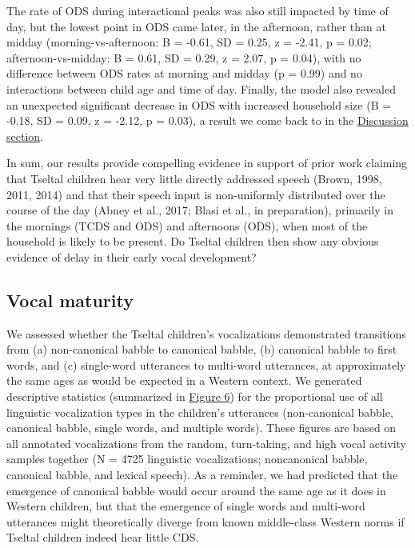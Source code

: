 \documentclass[floatsintext,man]{apa6}
\theoremstyle{definition}
\theoremstyle{definition}
\theoremstyle{definition}
\theoremstyle{remark}
\begin{document}
The rate of ODS during interactional peaks was also still impacted by
time of day, but the lowest point in ODS came later, in the afternoon,
rather than at midday (morning-vs-afternoon: B = -0.61, SD = 0.25, z =
-2.41, p = 0.02; afternoon-vs-midday: B = 0.61, SD = 0.29, z = 2.07, p =
0.04), with no difference between ODS rates at morning and midday (p =
0.99) and no interactions between child age and time of day. Finally,
the model also revealed an unexpected significant decrease in ODS with
increased household size (B = -0.18, SD = 0.09, z = -2.12, p = 0.03), a
result we come back to in the \protect\hyperlink{disc}{Discussion
section}.

In sum, our results provide compelling evidence in support of prior work
claiming that Tseltal children hear very little directly addressed
speech (Brown, 1998, 2011, 2014) and that their speech input is
non-uniformly distributed over the course of the day (Abney et al.,
2017; Blasi et al., in preparation), primarily in the mornings (TCDS and
ODS) and afternoons (ODS), when most of the household is likely to be
present. Do Tseltal children then show any obvious evidence of delay in
their early vocal development?

\subsection{Vocal maturity}\label{vocal-maturity}

We assessed whether the Tseltal children's vocalizations demonstrated
transitions from (a) non-canonical babble to canonical babble, (b)
canonical babble to first words, and (c) single-word utterances to
multi-word utterances, at approximately the same ages as would be
expected in a Western context. We generated descriptive statistics
(summarized in \protect\hyperlink{fig6}{Figure 6}) for the proportional
use of all linguistic vocalization types in the children's utterances
(non-canonical babble, canonical babble, single words, and multiple
words). These figures are based on all annotated vocalizations from the
random, turn-taking, and high vocal activity samples together (N = 4725
linguistic vocalizations; noncanonical babble, canonical babble, and
lexical speech). As a reminder, we had predicted that the emergence of
canonical babble would occur around the same age as it does in Western
children, but that the emergence of single words and multi-word
utterances might theoretically diverge from known middle-class Western
norms if Tseltal children indeed hear little CDS.
\end{document}
